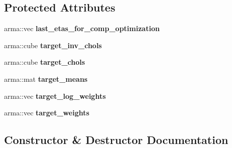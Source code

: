 \subsection*{Protected Attributes}
\begin{DoxyCompactItemize}
\item 
arma\+::vec {\bfseries last\+\_\+etas\+\_\+for\+\_\+comp\+\_\+optimization}\hypertarget{classVIPS__Model_a0b2633c15ce1dee47eb88e1fba20de0c}{}\label{classVIPS__Model_a0b2633c15ce1dee47eb88e1fba20de0c}

\item 
arma\+::cube {\bfseries target\+\_\+inv\+\_\+chols}\hypertarget{classVIPS__Model_ac181de1cbdb425e501b43d61162577e0}{}\label{classVIPS__Model_ac181de1cbdb425e501b43d61162577e0}

\item 
arma\+::cube {\bfseries target\+\_\+chols}\hypertarget{classVIPS__Model_a79230bd91c1c0f986deb5357883ed2c0}{}\label{classVIPS__Model_a79230bd91c1c0f986deb5357883ed2c0}

\item 
arma\+::mat {\bfseries target\+\_\+means}\hypertarget{classVIPS__Model_a01e37d2f3d74b66b5f7e28c25e0f1b4c}{}\label{classVIPS__Model_a01e37d2f3d74b66b5f7e28c25e0f1b4c}

\item 
arma\+::vec {\bfseries target\+\_\+log\+\_\+weights}\hypertarget{classVIPS__Model_a6b16122ed1ffd5e18adb0e96bc1fd58b}{}\label{classVIPS__Model_a6b16122ed1ffd5e18adb0e96bc1fd58b}

\item 
arma\+::vec {\bfseries target\+\_\+weights}\hypertarget{classVIPS__Model_adce427fb02e181c2a90bb2b095f6edaf}{}\label{classVIPS__Model_adce427fb02e181c2a90bb2b095f6edaf}

\end{DoxyCompactItemize}


\subsection{Constructor \& Destructor Documentation}
